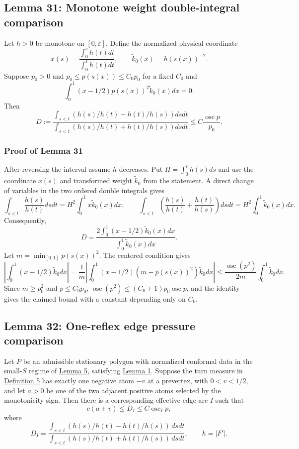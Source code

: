 \documentclass[11pt]{article}
\begin{document}
\subsection{Lemma 31: Monotone weight double-integral
comparison}\label{lem-monotone-weight-comparison}

Let \(h>0\) be monotone on \([0,\varepsilon]\). Define the normalized
physical coordinate \[
x(s)=\frac{\int_0^s h(t)dt}{\int_0^\varepsilon h(t)dt},
\qquad \widetilde k_0(x)=h(s(x))^{-2}.
\] Suppose \(p_0>0\) and \(p_0\le p(s(x))\le C_0p_0\) for a fixed
\(C_0\) and \[
\int_0^1(x-1/2)p(s(x))^2\widetilde k_0(x)dx=0.
\] Then \[
D:=\frac{\int_{s<t}(h(s)/h(t)-h(t)/h(s))dsdt}
{\int_{s<t}(h(s)/h(t)+h(t)/h(s))dsdt}
\le C\frac{\operatorname{osc}p}{p_0}.
\]

\subsubsection{Proof of Lemma
31}\label{proof-lem-monotone-weight-comparison}

After reversing the interval assume \(h\) decreases. Put
\(H=\int_0^\varepsilon h(s)ds\) and use the coordinate \(x(s)\) and
transformed weight \(\widetilde k_0\) from the statement. A direct
change of variables in the two ordered double integrals gives \[
\int_{s<t}\frac{h(s)}{h(t)}dsdt=H^2\int_0^1x\widetilde k_0(x)dx,
\qquad
\int_{s<t}\left(\frac{h(s)}{h(t)}+\frac{h(t)}{h(s)}\right)dsdt=H^2\int_0^1\widetilde k_0(x)dx.
\] Consequently, \[
D=\frac{2\int_0^1(x-1/2)\widetilde k_0(x)dx}{\int_0^1\widetilde k_0(x)dx}.
\] Let \(m=\min_{[0,1]}p(s(x))^2\). The centered condition gives \[
\left|\int_0^1(x-1/2)\widetilde k_0dx\right|
=\frac1m\left|\int_0^1(x-1/2)(m-p(s(x))^2)\widetilde k_0dx\right|
\le \frac{\operatorname{osc}(p^2)}{2m}\int_0^1\widetilde k_0dx.
\] Since \(m\ge p_0^2\) and \(p\le C_0p_0\),
\(\operatorname{osc}(p^2)\le(C_0+1)p_0\operatorname{osc}p\), and the
identity gives the claimed bound with a constant depending only on
\(C_0\).

\subsection{Lemma 32: One-reflex edge pressure
comparison}\label{lem-reflex-edge-pressure-comparison}

Let \(P\) be an admissible stationary polygon with normalized conformal
data in the small-\(S\) regime of \hyperref[lem-disk-perturbation]{Lemma
5}, satisfying \hyperref[lem-edge-moments]{Lemma 1}. Suppose the turn
measure in \hyperref[def-turn-measure]{Definition 5} has exactly one
negative atom \(-v\) at a prevertex, with \(0<v<1/2\), and let \(a>0\)
be one of the two adjacent positive atoms selected by the monotonicity
sign. Then there is a corresponding effective edge arc \(I\) such that
\[
c(a+v)\le D_I\le C\operatorname{osc}_I p,
\] where \[
D_I=\frac{\int_{s<t}(h(s)/h(t)-h(t)/h(s))\,dsdt}
{\int_{s<t}(h(s)/h(t)+h(t)/h(s))\,dsdt},
\qquad h=|F'|.
\]
\end{document}
